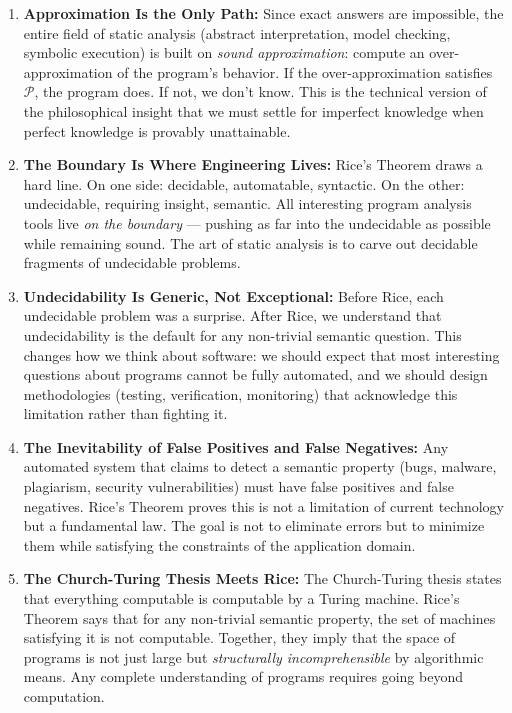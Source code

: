 \begin{enumerate}
\item \textbf{Approximation Is the Only Path:} Since exact answers are impossible, the entire field of static analysis (abstract interpretation, model checking, symbolic execution) is built on \emph{sound approximation}: compute an over-approximation of the program's behavior. If the over-approximation satisfies $\mathcal{P}$, the program does. If not, we don't know. This is the technical version of the philosophical insight that we must settle for imperfect knowledge when perfect knowledge is provably unattainable.

\item \textbf{The Boundary Is Where Engineering Lives:} Rice's Theorem draws a hard line. On one side: decidable, automatable, syntactic. On the other: undecidable, requiring insight, semantic. All interesting program analysis tools live \emph{on the boundary} --- pushing as far into the undecidable as possible while remaining sound. The art of static analysis is to carve out decidable fragments of undecidable problems.

\item \textbf{Undecidability Is Generic, Not Exceptional:} Before Rice, each undecidable problem was a surprise. After Rice, we understand that undecidability is the default for any non-trivial semantic question. This changes how we think about software: we should expect that most interesting questions about programs cannot be fully automated, and we should design methodologies (testing, verification, monitoring) that acknowledge this limitation rather than fighting it.

\item \textbf{The Inevitability of False Positives and False Negatives:} Any automated system that claims to detect a semantic property (bugs, malware, plagiarism, security vulnerabilities) must have false positives and false negatives. Rice's Theorem proves this is not a limitation of current technology but a fundamental law. The goal is not to eliminate errors but to minimize them while satisfying the constraints of the application domain.

\item \textbf{The Church-Turing Thesis Meets Rice:} The Church-Turing thesis states that everything computable is computable by a Turing machine. Rice's Theorem says that for any non-trivial semantic property, the set of machines satisfying it is not computable. Together, they imply that the space of programs is not just large but \emph{structurally incomprehensible} by algorithmic means. Any complete understanding of programs requires going beyond computation.


\end{enumerate}
